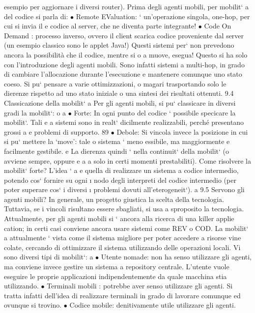 \documentclass[a4paper,12pt]{article}
\begin{document}
esempio per aggiornare i diversi router). Prima degli agenti mobili, per mobilit`
a
del codice si parla di:
$\bullet$ Remote EValuation: ` un'operazione singola, one-hop, per cui si invia il
e
codice al server, che ne diventa parte integrante!
$\bullet$ Code On Demand : processo inverso, ovvero il client scarica codice proveniente dal server (un esempio classico
sono le applet Java!)
Questi sistemi per` non prevedono ancora la possibilità che il codice, mentre si
o
a
muove, esegua! Questo si ha solo con l'introduzione degli agenti mobili. Sono infatti sistemi a multi-hop, in grado di
cambiare l'allocazione durante l'esecuzione
e mantenere comunque uno stato coeso. Si pu` pensare a varie ottimizzazioni,
o
magari trasportando solo le dierenze rispetto ad uno stato iniziale o una sintesi
dei risultati ottenuti.
9.4
Classicazione della mobilit`
a
Per gli agenti mobili, si pu` classicare in diversi gradi la mobilit`:
o
a
$\bullet$ Forte: In ogni punto del codice ` possibile specicare la mobilit`. Tali
e
a
sistemi sono in realt` dicilmente realizzabili, perché presentano grossi
a
e
problemi di supporto.
89
$\bullet$ Debole: Si vincola invece la posizione in cui si pu` mettere la {`}move': tale
o
sistema ` meno essibile, ma maggiormente e facilmente gestibile.
e
La dierenza quindi ` nella continuit` della mobilit` (o avviene sempre, oppure
e
a
a
solo in certi momenti prestabiliti). Come risolvere la mobilit` forte? L'idea `
a
e
quella di realizzare un sistema a codice intermedio, potendo cos` fornire su ogni
\i{}
nodo degli interpreti del codice intermedio (per poter superare cos` i diversi
\i{}
problemi dovuti all'eterogeneit`).
a
9.5
Servono gli agenti mobili?
In generale, un progetto giustica la scelta della tecnologia. Tuttavia, se i vincoli
risultano essere sbagliati, si usa a sproposito la tecnologia.
Attualmente, per gli agenti mobili si ` ancora alla ricerca di una killer applie
cation; in certi casi conviene ancora usare sistemi come REV o COD. La mobilit`
a
attualmente ` vista come il sistema migliore per poter accedere a risorse vine
colate, cercando di ottimizzare il sistema utilizzando delle operazioni locali. Vi
sono diversi tipi di mobilit`:
a
$\bullet$ Utente nomade: non ha senso utilizzare gli agenti, ma conviene invece
gestire un sistema a repository centrale. L'utente vuole eseguire le proprie
applicazioni indipendentemente da quale macchina stia utilizzando.
$\bullet$ Terminali mobili : potrebbe aver senso utilizzare gli agenti. Si tratta infatti
dell'idea di realizzare terminali in grado di lavorare comunque ed ovunque
si trovino.
$\bullet$ Codice mobile: denitivamente utile utilizzare gli agenti.
\end{document}
